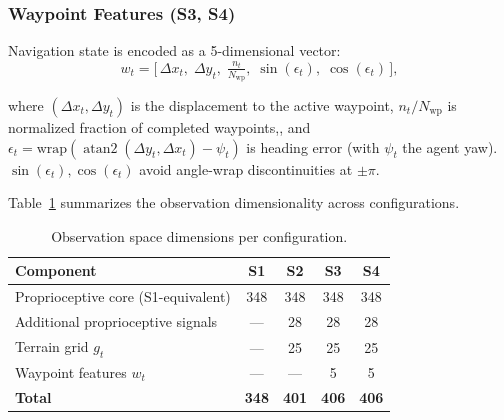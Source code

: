 \documentclass[conference]{IEEEtran}
\begin{document}
\subsubsection{Waypoint Features (S3, S4)}

Navigation state is encoded as a 5-dimensional vector:
\begin{equation}
\label{eq:waypoint_signal}
w_t = \Big[\,\Delta x_t,\;\Delta y_t,\;\tfrac{n_t}{N_{\mathrm{wp}}},\;\sin(\epsilon_t),\;\cos(\epsilon_t)\,\Big],
\end{equation}

where $(\Delta x_t, \Delta y_t)$ is the displacement to the active waypoint, $n_t/N_{\mathrm{wp}}$ is normalized fraction of completed waypoints,, and $\epsilon_t=\mathrm{wrap}\!\left(\operatorname{atan2}(\Delta y_t,\Delta x_t)-\psi_t\right)$ is heading error (with $\psi_t$ the agent yaw). $\sin(\epsilon_t),\cos(\epsilon_t)$ avoid angle-wrap discontinuities at $\pm\pi$.


Table~\ref{tab:obs_dims} summarizes the observation dimensionality across configurations.

\begin{table}[h!]
\caption{Observation space dimensions per configuration.}
\label{tab:obs_dims}
\centering
\small
\begin{tabular}{@{}lcccc@{}}
\toprule
\textbf{Component} & \textbf{S1} & \textbf{S2} & \textbf{S3} & \textbf{S4} \\
\midrule
Proprioceptive core (S1-equivalent)\footnotemark & 348 & 348 & 348 & 348 \\
Additional proprioceptive signals & --- & 28 & 28 & 28 \\
Terrain grid $g_t$ & --- & 25 & 25 & 25 \\
Waypoint features $w_t$ & --- & --- & 5 & 5 \\
\midrule
\textbf{Total} & \textbf{348} & \textbf{401} & \textbf{406} & \textbf{406} \\
\bottomrule
\end{tabular}
\end{table}
\end{document}
